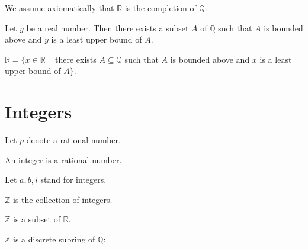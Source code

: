 \documentclass[english]{article}
\begin{document}
We assume axiomatically that $\mathbb{R}$ is the completion of $\mathbb{Q}$.

\begin{forthel}
\begin{axiom} Let $y$ be a real number.
Then there exists a subset $A$ of $\mathbb{Q}$
such that $A$ is bounded above and
$y$ is a least upper bound of $A$.
\end{axiom}

\begin{theorem}
$\mathbb{R} = \{x \in \mathbb{R} \mid$ there exists $
A \subseteq \mathbb{Q}$ such that $
A$ is bounded above and $x$ is a least upper
bound of $A\}$.
\end{theorem}

\end{forthel}


\section{Integers}

\begin{forthel}
Let $p$ denote a rational number.

\begin{signature}
An integer is a rational number.
\end{signature}
Let $a,b,i$ stand for integers.

\begin{definition}
$\mathbb{Z}$ is the collection of integers.
\end{definition}


\begin{theorem}
$\mathbb{Z}$ is a subset of $\mathbb{R}$.
\end{theorem}

\end{forthel}


$\mathbb{Z}$ is a discrete subring of $\mathbb{Q}$:
\end{document}
